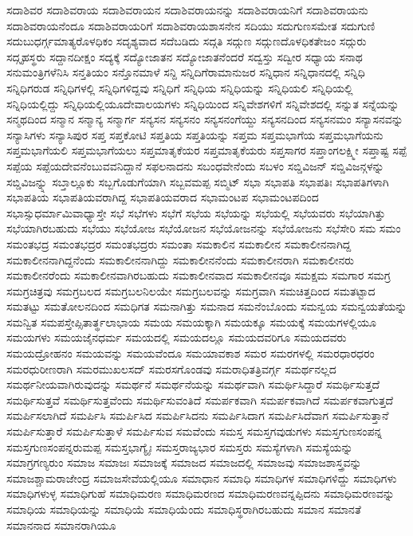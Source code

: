 {ಸದಾಶಿವರ
ಸದಾಶಿವರಾಯ
ಸದಾಶಿವರಾಯನ
ಸದಾಶಿವರಾಯನನ್ನು
ಸದಾಶಿವರಾಯನಿಗೆ
ಸದಾಶಿವರಾಯನು
ಸದಾಶಿವರಾಯನೆಂದೂ
ಸದಾಶಿವರಾಯರಿಗೆ
ಸದಾಶಿವರಾಯಶಾಸನೇನ
ಸದಿಯು
ಸದುಗುಣಸಮೇತ
ಸದುಗುಣಿ
ಸದುಬುಧರ್ಗ್ಗಮಾತ್ಯರೊಳಧಿಕಂ
ಸದೃಶ್ಯವಾದ
ಸದೆಬಡಿದು
ಸದ್ಗತಿ
ಸದ್ಗುಣ
ಸದ್ಗುಣದೊಳಧಿಕತೇಜಂ
ಸದ್ಗುರು
ಸದ್ಗೃಹಸ್ಥರು
ಸದ್ದಾನದೀಕ್ಷಂ
ಸದ್ಯಕ್ಕೆ
ಸದ್ಯೋಜಾತನ
ಸದ್ಯೋಜಾತನೆಂದರೆ
ಸದ್ವಸ್ತು
ಸದ್ವೀರ
ಸಧ್ಯಾಯ
ಸನಾಥ
ಸನುಮಂತ್ರಿಗಳೆನಿಸಿ
ಸನ್ತತಿಯಂ
ಸನ್ತೊನಮಾಳೆ
ಸನ್ದಿ
ಸನ್ನಿದಿಗೆರಾಮಾನುಜರ
ಸನ್ನಿಧಾನ
ಸನ್ನಿಧಾನದಲ್ಲಿ
ಸನ್ನಿಧಿ
ಸನ್ನಿಧಿಗರುಡ
ಸನ್ನಿಧಿಗಳಲ್ಲಿ
ಸನ್ನಿಧಿಗಳಿದ್ದವು
ಸನ್ನಿಧಿಗೆ
ಸನ್ನಿಧಿಯ
ಸನ್ನಿಧಿಯನ್ನು
ಸನ್ನಿಧಿಯಲಿ
ಸನ್ನಿಧಿಯಲ್ಲಿ
ಸನ್ನಿಧಿಯಲ್ಲಿದ್ದು
ಸನ್ನಿಧಿಯಲ್ಲಿಯೂದೇವಾಲಯಗಳು
ಸನ್ನಿಧಿಯಿಂದ
ಸನ್ನಿವೇಶಗಳಿಗೆ
ಸನ್ನಿವೇಶದಲ್ಲಿ
ಸನ್ನುತ
ಸನ್ನೆಯನ್ನು
ಸನ್ಮಥದಿಂದ
ಸನ್ಮಾನ
ಸನ್ಮಾನ್ಯ
ಸನ್ಮಾರ್ಗ
ಸನ್ಯಸನ
ಸನ್ಯಸನಂ
ಸನ್ಯಸನಂಗೆಯ್ದು
ಸನ್ಯಸನದಿಂದ
ಸನ್ಯಸನಮಂ
ಸನ್ಯಾಸನವನ್ನು
ಸನ್ಯಾಸಿಗಳು
ಸನ್ಯಾಸಿಪುರ
ಸಪ್ತ
ಸಪ್ತಕೋಟಿ
ಸಪ್ತತಿಯ
ಸಪ್ತತಿಯನ್ನು
ಸಪ್ತಮ
ಸಪ್ತಮಭಾಗೆಯ
ಸಪ್ತಮಭಾಗೆಯನು
ಸಪ್ತಮಭಾಗೆಯಲಿ
ಸಪ್ತಮಭಾಗೆಯಲು
ಸಪ್ತಮಾತೃಕೆಯರ
ಸಪ್ತಮಾತೃಕೆಯರು
ಸಪ್ತಸಾಗರ
ಸಪ್ತಾಂಗಲಕ್ಷ್ಮೀ
ಸಪ್ತಾಷ್ಟ
ಸಪ್ಪೆ
ಸಪ್ಪೆಯ
ಸಪ್ಪೆಯದೇವನೆಂಬುವವನಿದ್ದಾನೆ
ಸಫಲನಾದನು
ಸಬಂಧವೇನೆಂದು
ಸಬಳಂ
ಸಬ್ಡಿವಿಜನ್
ಸಬ್ಡಿವಿಜನ್ಗಳನ್ನು
ಸಬ್ಡಿವಿಜನ್ನ್ನು
ಸಬ್ತಾಲ್ಲೂಕು
ಸಬ್ಬಗೊಡುಗೆಯಾಗಿ
ಸಬ್ಬವಮಪ್ಪ
ಸಬ್ಮಿಟ್
ಸಭಾ
ಸಭಾಪತಿ
ಸಭಾಪತಿಃ
ಸಭಾಪತಿಗಳಾಗಿ
ಸಭಾಪತಿಯ
ಸಭಾಪತಿಯವರಾಗಿದ್ದ
ಸಭಾಪತಿಯವರಾದ
ಸಭಾಮಂಟಪ
ಸಭಾಮಂಟಪದಿಂದ
ಸಭಾಸ್ಸುಧರ್ಮಾಮಿವಾಧ್ಯಾಸ್ತೇ
ಸಭೆ
ಸಭೆಗಳು
ಸಭೆಗೆ
ಸಭೆಯ
ಸಭೆಯನ್ನು
ಸಭೆಯಲ್ಲಿ
ಸಭೆಯವರು
ಸಭೆಯಾಗಿತ್ತು
ಸಭೆಯಾಗಿರಬಹುದು
ಸಭೆಯು
ಸಭೆಯೋಜ
ಸಭೆಯೋಜನ
ಸಭೆಯೋಜನನ್ನು
ಸಭೆಯೋಜನು
ಸಭೆಸೇರಿ
ಸಮ
ಸಮಂ
ಸಮಂತಭದ್ರ
ಸಮಂತಭದ್ರರ
ಸಮಂತಭದ್ರರು
ಸಮಂತಾ
ಸಮಕಾಲಿನ
ಸಮಕಾಲೀನ
ಸಮಕಾಲೀನನಾಗಿದ್ದ
ಸಮಕಾಲೀನನಾಗಿದ್ದನೆಂದು
ಸಮಕಾಲೀನನಾಗಿದ್ದು
ಸಮಕಾಲೀನನೆಂದು
ಸಮಕಾಲೀನರಾಗಿ
ಸಮಕಾಲೀನರು
ಸಮಕಾಲೀನರೆಂದು
ಸಮಕಾಲೀನವಾಗಿರಬಹುದು
ಸಮಕಾಲೀನವಾದ
ಸಮಕಾಲೀನವೂ
ಸಮಕ್ಷಮ
ಸಮಗಾರ
ಸಮಗ್ರ
ಸಮಗ್ರಚಿತ್ರವು
ಸಮಗ್ರಬಲದ
ಸಮಗ್ರಬಲನಿಲಯೇ
ಸಮಗ್ರಬಲವನ್ನು
ಸಮಗ್ರವಾಗಿ
ಸಮಚಿತ್ತದಿಂದ
ಸಮತಟ್ಟಾದ
ಸಮತಟ್ಟು
ಸಮತೋಲನದಿಂದ
ಸಮಧಿಗತ
ಸಮನಾಗಿತ್ತು
ಸಮನಾದ
ಸಮನೆಂಬೊಂದು
ಸಮನ್ವಯ
ಸಮನ್ವಯತೆಯನ್ನು
ಸಮನ್ವಿತ
ಸಮಪಸ್ತೇಪ್ಸಿತಾರ್ತ್ಥಲಾಭಾಯ
ಸಮಯ
ಸಮಯಕ್ಕಾಗಿ
ಸಮಯಕ್ಕೂ
ಸಮಯಕ್ಕೆ
ಸಮಯಗಳಲ್ಲಿಯೂ
ಸಮಯಗಳು
ಸಮಯಜೈನಧರ್ಮ
ಸಮಯದಲ್ಲಿ
ಸಮಯದಲ್ಲೂ
ಸಮಯದವರಿಗೂ
ಸಮಯದವರು
ಸಮಯದ್ರೋಹನಂ
ಸಮಯವನ್ನು
ಸಮಯವೆಂದೂ
ಸಮಯಾವಕಾಶ
ಸಮರ
ಸಮರಗಳಲ್ಲಿ
ಸಮರಧಾರಧರಂ
ಸಮರಧುರೀಣರಾಗಿ
ಸಮರಮುಖಲಸದ್
ಸಮರಸಗೊಂಡವು
ಸಮರಾಧಿತತ್ರಿವರ್ಗ್ಗ
ಸಮರ್ಥನಲ್ಲದ
ಸಮರ್ಥನೀಯವಾಗಿರುವುದನ್ನು
ಸಮರ್ಥನೆ
ಸಮರ್ಥನೆಯನ್ನು
ಸಮರ್ಥವಾಗಿ
ಸಮರ್ಥಿಸಿದ್ದಾರೆ
ಸಮರ್ಥಿಸುತ್ತದೆ
ಸಮರ್ಥಿಸುತ್ತವೆ
ಸಮರ್ಥಿಸುತ್ತವೆಂದು
ಸಮರ್ಥಿಸುವಂತಿದೆ
ಸಮರ್ಪಕವಾಗಿ
ಸಮರ್ಪಕವಾಗಿದೆ
ಸಮರ್ಪಕವಾಗುತ್ತದೆ
ಸಮರ್ಪಿಸಲಾಗಿದೆ
ಸಮರ್ಪಿಸಿ
ಸಮರ್ಪಿಸಿದ
ಸಮರ್ಪಿಸಿದನು
ಸಮರ್ಪಿಸಿದಾಗ
ಸಮರ್ಪಿಸಿದೆವಾಗ
ಸಮರ್ಪಿಸುತ್ತಾನೆ
ಸಮರ್ಪಿಸುತ್ತಾರೆ
ಸಮರ್ಪಿಸುತ್ತಾಳೆ
ಸಮರ್ಪಿಸುವ
ಸಮವೆಂದು
ಸಮಸ್ತ
ಸಮಸ್ತಗವುಡುಗಳು
ಸಮಸ್ತಗುಣಸಂಪನ್ನ
ಸಮಸ್ತಗುಣಸಂಪನ್ನರುಮಪ್ಪ
ಸಮಸ್ತಭಾಗ್ಯೈಃ
ಸಮಸ್ತರಾಜ್ಯಭಾರ
ಸಮಸ್ತರು
ಸಮಸ್ಯೆಗಳಾಗಿ
ಸಮಸ್ಯೆಯನ್ನು
ಸಮಾಗ್ರಗಣ್ಯರುಂ
ಸಮಾಜ
ಸಮಾಜಃ
ಸಮಾಜಕ್ಕೆ
ಸಮಾಜದ
ಸಮಾಜದಲ್ಲಿ
ಸಮಾಜವು
ಸಮಾಜಶಾಸ್ತ್ರವನ್ನು
ಸಮಾಜಶ್ಚಾಮರಾಜೇಂದ್ರ
ಸಮಾಜಸೇವೆಯಲ್ಲಿಯೂ
ಸಮಾಧಾನ
ಸಮಾಧಿ
ಸಮಾಧಿಗಳ
ಸಮಾಧಿಗಳಿದ್ದು
ಸಮಾಧಿಗಳು
ಸಮಾಧಿಗಳುಳ್ಳ
ಸಮಾಧಿಗುಹೆ
ಸಮಾಧಿಮರಣ
ಸಮಾಧಿಮರಣದ
ಸಮಾಧಿಮರಣವನ್ನಪ್ಪಿದನು
ಸಮಾಧಿಮರಣವನ್ನು
ಸಮಾಧಿಯ
ಸಮಾಧಿಯನ್ನು
ಸಮಾಧಿಯೆ
ಸಮಾಧಿಯೆಂದು
ಸಮಾಧಿಸ್ಥರಾಗಿರಬಹುದು
ಸಮಾನ
ಸಮಾನತೆ
ಸಮಾನನಾದ
ಸಮಾನರಾಗಿಯೂ
}
